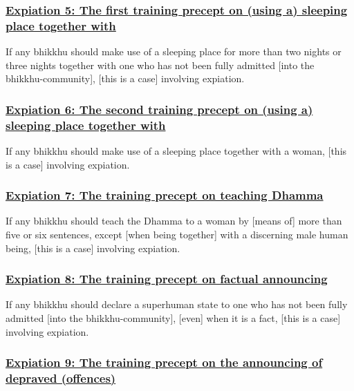 \subsubsection*{\hyperref[pac5]{Expiation 5: The first training precept on (using a) sleeping place together with}}
\label{exp5}

If any bhikkhu should make use of a sleeping place for more than two nights or three nights together with one who has not been fully admitted [into the bhikkhu-community], [this is a case] involving expiation.



\subsubsection*{\hyperref[pac6]{Expiation 6: The second training precept on (using a) sleeping place together with}}
\label{exp6}

If any bhikkhu should make use of a sleeping place together with a woman, [this is a case] involving expiation.



\subsubsection*{\hyperref[pac7]{Expiation 7: The training precept on teaching Dhamma}}
\label{exp7}

If any bhikkhu should teach the Dhamma to a woman by [means of] more than five or six sentences, except [when being together] with a discerning male human being, [this is a case] involving expiation.



\subsubsection*{\hyperref[pac8]{Expiation 8: The training precept on factual announcing}}
\label{exp8}

If any bhikkhu should declare a superhuman state to one who has not been fully admitted [into the bhikkhu-community], [even] when it is a fact, [this is a case] involving expiation.



\subsubsection*{\hyperref[pac9]{Expiation 9: The training precept on the announcing of depraved (offences)}}
\label{exp9}

